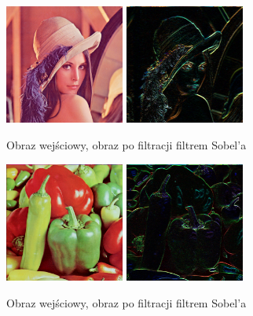 \documentclass[final,a4paper,openany,12pt]{mwbk}
\begin{document}
\begin{figure}[H]
	\begin{center}
		\includegraphics[width=0.35\textwidth]{lena_color}
		\includegraphics[width=0.35\textwidth]{lena_color_highpassSobol_result}
	\end{center}
	\caption{Obraz wejściowy, obraz po filtracji filtrem Sobel'a}
\end{figure}

\begin{figure}[H]
	\begin{center}
		\includegraphics[width=0.35\textwidth]{peppers_color}
		\includegraphics[width=0.35\textwidth]{peppers_color_highpassSobol_result}
	\end{center}
	\caption{Obraz wejściowy, obraz po filtracji filtrem Sobel'a}
\end{figure}
\newpage
\end{document}
